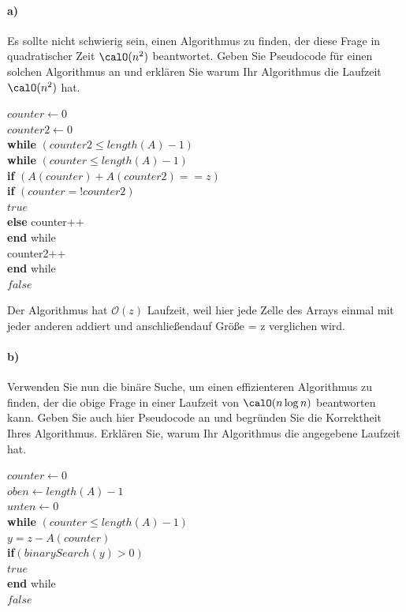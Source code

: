 \documentclass[paper=a4, fontsize=11pt]{scrartcl}
\numberwithin{equation}{section}
\numberwithin{figure}{section}
\numberwithin{table}{section}
\begin{document}
\paragraph{a)}
Es sollte nicht schwierig sein, einen Algorithmus zu finden, der diese Frage in quadratischer Zeit $\calO(n^2)$ beantwortet. Geben Sie Pseudocode für einen solchen Algorithmus an und erklären Sie warum Ihr Algorithmus die Laufzeit $\calO(n^2)$ hat. \\

\begin{algorithm}[H]
\SetAlgoLined
{}
$counter \leftarrow 0$\\
$counter2 \leftarrow 0$\\
\textbf{while} $(counter2 \leq length(A)-1)$ \\
\textbf{while} $(counter \leq length(A)-1)$ \\
\textbf{if} $(A(counter)+A(counter2) == z)$ \\
\textbf{if} $(counter =! counter2)$ \\
\Return $true$ \\
\textbf{else} counter++ \\
\textbf{end} while \\
counter2++ \\
\textbf{end} while \\
\Return $false$
\end{algorithm}

Der Algorithmus hat $\mathcal{O}(z)$ Laufzeit, weil hier jede Zelle des Arrays einmal mit jeder anderen addiert und anschließendauf Größe = z verglichen wird.

\paragraph{b)}
Verwenden Sie nun die binäre Suche, um einen effizienteren Algorithmus zu finden, der die obige Frage in einer Laufzeit von $\calO(n\log n)$ beantworten kann. Geben Sie auch hier Pseudocode an und begründen Sie die Korrektheit Ihres Algorithmus. Erklären Sie, warum Ihr Algorithmus die angegebene Laufzeit hat. \\

\begin{algorithm}[H]
\SetAlgoLined
{}
\KwOut{}
$counter \leftarrow 0$\\
$oben \leftarrow length(A)-1$\\
$unten \leftarrow 0$ \\
\textbf{while} $(counter \leq length(A)-1)$ \\
$y=z-A(counter)$ \\
\textbf{if}$(binarySearch(y) > 0)$ \\
\Return $true$ \\
\textbf{end} while \\
\Return $false$ \\
\end{algorithm}
\end{document}
